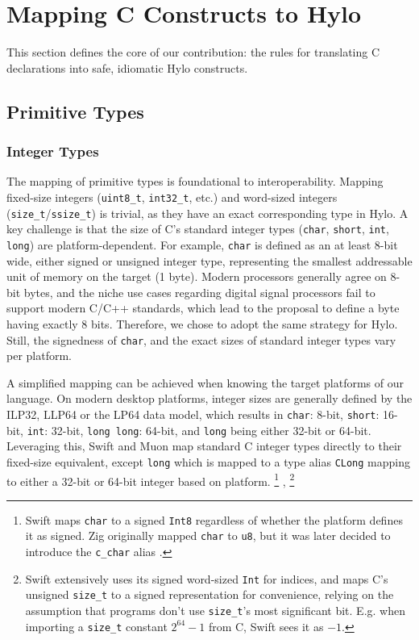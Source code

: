 \section{Mapping C Constructs to Hylo}
\label{sec:mapping_c_constructs}

This section defines the core of our contribution: the rules for translating C declarations into safe, idiomatic Hylo constructs.

\subsection{Primitive Types}
\subsubsection{Integer Types}
The mapping of primitive types is foundational to interoperability. Mapping fixed-size integers (\texttt{uint8\_t}, \texttt{int32\_t}, etc.) and word-sized integers (\texttt{size\_t}/\texttt{ssize\_t}) is trivial, as they have an exact corresponding type in Hylo. A key challenge is that the size of C's standard integer types (\texttt{char}, \texttt{short}, \texttt{int}, \texttt{long}) are platform-dependent. For example, \texttt{char} is defined as an at least 8-bit wide, either signed or unsigned integer type, representing the smallest addressable unit of memory on the target (1 byte). Modern processors generally agree on 8-bit bytes, and the niche use cases regarding digital signal processors fail to support modern C/C++ standards, which lead to the proposal \cite{P3477R1} to define a byte having exactly 8 bits. Therefore, we chose to adopt the same strategy for Hylo. Still, the signedness of \texttt{char}, and the exact sizes of standard integer types vary per platform.



A simplified mapping can be achieved when knowing the target platforms of our language. On modern desktop platforms, integer sizes are generally defined by the ILP32, LLP64 or the LP64 data model, which results in \texttt{char}: 8-bit, \texttt{short}: 16-bit, \texttt{int}: 32-bit, \texttt{long long}: 64-bit, and \texttt{long} being either 32-bit or 64-bit. Leveraging this, Swift and Muon map standard C integer types directly to their fixed-size equivalent, except \texttt{long} which is mapped to a type alias \texttt{CLong} mapping to either a 32-bit or 64-bit integer based on platform.
\footnote{
    Swift maps \texttt{char} to a signed \texttt{Int8} regardless of whether the platform defines it as signed. Zig originally mapped \texttt{char} to \texttt{u8}, but it was later decided to introduce the \texttt{c\_char} alias \cite{zig-add-cchar}.
}
,
\footnote{
    Swift extensively uses its signed word-sized \texttt{Int} for indices, and maps C's unsigned \texttt{size\_t} to a signed representation for convenience, relying on the assumption that programs don't use \texttt{size\_t}'s most significant bit. E.g. when importing a \texttt{size\_t} constant $2^{64} -1$ from C, Swift sees it as $-1$.
}



